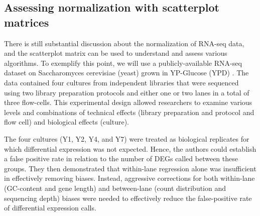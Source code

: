 \documentclass{bioinfo}
\begin{document}
\subsection{Assessing normalization with scatterplot matrices}

There is still substantial discussion about the normalization of RNA-seq data, and the scatterplot matrix can be used to understand and assess various algorithms. To exemplify this point, we will use a publicly-available RNA-seq dataset on Saccharomyces cerevisiae (yeast) grown in YP-Glucose (YPD) \citep{Risso}. The data contained four cultures from independent libraries that were sequenced using two library preparation protocols and either one or two lanes in a total of three flow-cells. This experimental design allowed researchers to examine various levels and combinations of technical effects (library preparation and protocol and flow cell) and biological effects (culture).

The four cultures (Y1, Y2, Y4, and Y7) were treated as biological replicates for which differential expression was not expected. Hence, the authors could establish a false positive rate in relation to the number of DEGs called between these groups. They then demonstrated that within-lane regression alone was insufficient in effectively removing biases. Instead, aggressive corrections for both within-lane (GC-content and gene length) and between-lane (count distribution and sequencing depth) biases were needed to effectively reduce the false-positive rate of differential expression calls.
\end{document}

